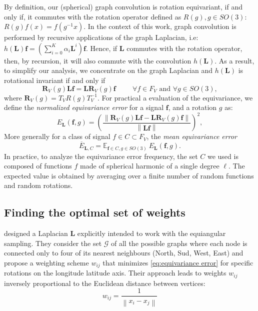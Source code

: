 \documentclass{article} %
\newcommand{\norm}[1]{\left\lVert#1\right\rVert}
\renewcommand{\b}[1]{{\bm{#1}}}   %
\newcommand{\nati}[1]{{\color[rgb]{.3,.5,.9}{#1}}}
\newcommand{\mart}[1]{{\color[rgb]{.9,.5,.3}{#1}}}
\begin{document}
By definition, our (spherical) graph convolution is rotation equivariant, if and only if, it commutes with the rotation operator defined as $R(g), g\in SO(3)$: $R(g) f(x) = f\left(g^{-1} x \right)$.
In the context of this work, graph convolution is performed by recursive applications of the graph Laplacian, i.e: $h(\b{L}) \b{f} = \left(\sum_{i=0}^K \alpha_i \b{L}^i\right) \b{f}$\nati{Put this equation somewhere else?}.  Hence, if $\b{L}$ commutes with the rotation operator, then, by recursion, it will also commute with the convolution $h(\b{L})$.
As a result, to simplify our analysis, we concentrate on the graph Laplacian and $h(\b{L})$ is rotational invariant if and only if
\mart{Correct formula for equivariance error and the corresponding plots as soon as you changed it!}
\begin{equation} \label{eq:equivariance}
	\b{R}_V(g) \b{L} \b{f} = \b{L} \b{R}_V(g) \b{f} \hspace{1cm} \forall f\in F_V \text{ and } \forall g\in SO(3),
\end{equation}
where $\b{R}_V(g) = T_V R(g) T_V^{-1}$. For practical a evaluation of the equivariance, we define the \textit{normalized equivariance error} for a signal $\b{f}$, and a  rotation $g$ as:
\begin{equation} \label{eq:equivariance error}
	E_{\b{L}}(\b{f}, g) = \left(\frac{ \norm {\b{R}_V(g) \b{L} \b{f} - \b{L} \b{R}_V(g) \b{f}} }{\norm {\b{L} \b{f}}}\right)^2,
\end{equation}
More generally for a class of signal $f \in C \subset F_V$, the \textit{mean equivariance error}
\begin{equation} \label{eq:mean equivariance error}
	\overline E_{\b{L}, C} = \mathbb E_{\b{f}\in C, g\in SO(3)} \ E_{\b{L}}(\b{f}, g).
\end{equation}
\mart{Talk about the probability measure used on C, SO(3)?}
In practice, to analyze the equivariance error frequency,  the set $C$ we used is composed of functions $f$ made of spherical harmonic of a single degree $\ell$.
The expected value is obtained by averaging over a finite number of random functions and random rotations.

\subsection{Finding the optimal set of weights}
\cite{khasanova2017sphericalcnn} designed a Laplacian $\b{L}$ explicitly intended to work with the equiangular sampling.
They consider the set $\mathcal{G}$ of all the possible graphs where each node is connected only to four of its nearest neighbours (North, Sud, West, East) and propose a weighting scheme $w_{ij}$ that minimizes \eqref{eq:equivariance error} for specific rotations on the longitude latitude axis.
Their approach leads to weights $w_{ij}$ inversely proportional to the Euclidean distance between vertices:
\begin{equation} \label{eq:frossard weights}
	w_{ij} = \frac{1}{\norm{x_i-x_j}}
\end{equation}
\end{document}
